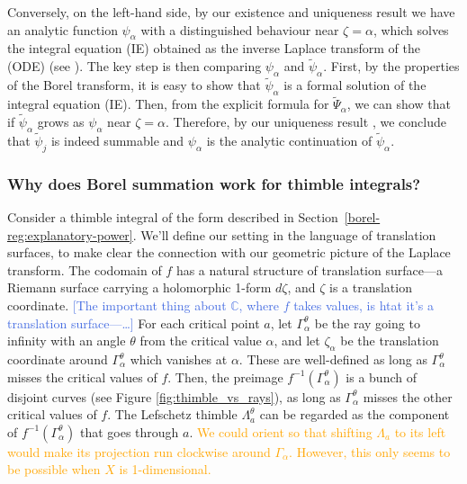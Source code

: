 \documentclass{article}
\newcommand{\C}{\mathbb{C}}
\newcommand{\series}[1]{\tilde{#1}}
\theoremstyle{definition}
\theoremstyle{plain}
\begin{document}
Conversely, on the left-hand side, by our existence and uniqueness result \cite[Theorem 4]{reg-sing-volterra} we have an analytic function $\psi_\alpha$ with a distinguished behaviour near $\zeta=\alpha$, which solves the integral equation (IE) obtained as the inverse Laplace transform of the (ODE) (see \cite[Lemma 2]{reg-sing-volterra}). The key step is then comparing $\psi_\alpha$ and $\tilde{\psi}_\alpha$. First, by the properties of the Borel transform, it is easy to show that $\series{\psi}_\alpha$ is a formal solution of the integral equation (IE). Then, from the explicit formula for $\tilde{\Psi}_\alpha$, we can show that if $\tilde{\psi}_\alpha$ grows as $\psi_\alpha$ near $\zeta=\alpha$. Therefore, by our uniqueness result \cite[Theorem 4]{reg-sing-volterra}, we conclude that $\tilde{\psi}_j$ is indeed summable and ${\psi}_\alpha$ is the analytic continuation of $\tilde{\psi}_\alpha$.

\subsubsection{Why does Borel summation work for thimble integrals?}
Consider a thimble integral of the form described in Section~\ref{borel-reg:explanatory-power}. We'll define our setting in the language of translation surfaces, to make clear the connection with our geometric picture of the Laplace transform. The codomain of $f$ has a natural structure of translation surface---a Riemann surface carrying a holomorphic 1-form $d\zeta$, and $\zeta$ is a translation coordinate. \textcolor{RoyalBlue}{[The important thing about $\C$, where $f$ takes values, is htat it's a translation surface---\ldots]} For each critical point $a$, let $\Gamma_\alpha^\theta$ be the ray going to infinity with an angle $\theta$ from the critical value $\alpha$, and let $\zeta_{\alpha}$ be the translation coordinate around $\Gamma_\alpha^\theta$ which vanishes at $\alpha$. These are well-defined as long as $\Gamma_\alpha^\theta$ misses the critical values of $f$. Then, the preimage $f^{-1}(\Gamma_\alpha^\theta)$ is a bunch of disjoint curves (see Figure \ref{fig:thimble_vs_rays}), as long as $\Gamma_\alpha^\theta$ misses the other critical values of $f$. The Lefschetz thimble $\Lambda_a^\theta$ can be regarded as the component of $f^{-1}(\Gamma_\alpha^\theta)$ that goes through $a$.  \textcolor{orange}{We could orient so that shifting $\Lambda_a$ to its left would make its projection run clockwise around $\Gamma_\alpha$. However, this only seems to be possible when $X$ is 1-dimensional.} 
\end{document}

